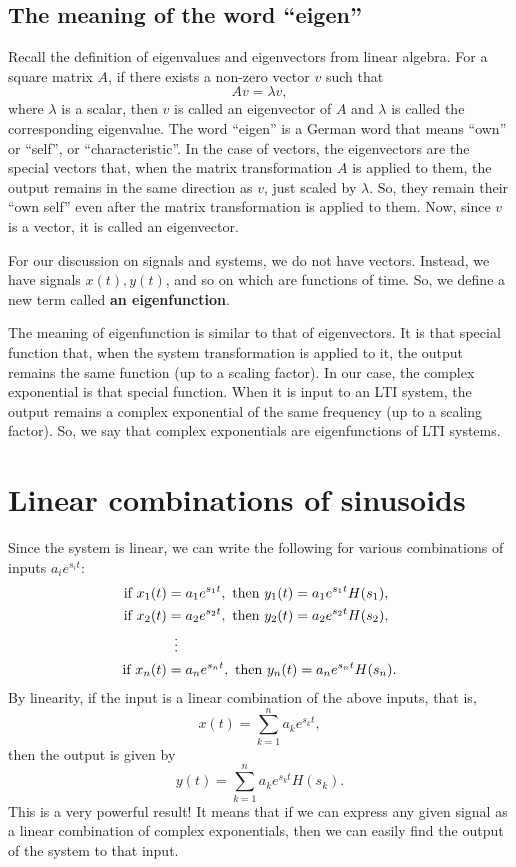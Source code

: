 \documentclass{ee102_notes}
\begin{document}
\subsection{The meaning of the word ``eigen''}
Recall the definition of eigenvalues and eigenvectors from linear algebra. For a square matrix \(A\), if there exists a non-zero vector \(v\) such that
\[
Av = \lambda v,
\]
where \(\lambda\) is a scalar, then \(v\) is called an eigenvector of \(A\) and \(\lambda\) is called the corresponding eigenvalue. The word ``eigen'' is a German word that means ``own'' or ``self'', or ``characteristic''. In the case of vectors, the eigenvectors are the special vectors that, when the matrix transformation $A$ is applied to them, the output remains in the same direction as $v$, just scaled by $\lambda$. So, they remain their ``own self'' even after the matrix transformation is applied to them. Now, since $v$ is a vector, it is called an eigenvector. 

For our discussion on signals and systems, we do not have vectors. Instead, we have signals $x(t), y(t)$, and so on which are functions of time. So, we define a new term called \textbf{an eigenfunction}. 

The meaning of eigenfunction is similar to that of eigenvectors. It is that special function that, when the system transformation is applied to it, the output remains the same function (up to a scaling factor). In our case, the complex exponential is that special function. When it is input to an LTI system, the output remains a complex exponential of the same frequency (up to a scaling factor). So, we say that complex exponentials are eigenfunctions of LTI systems.

\section{Linear combinations of sinusoids}
Since the system is linear, we can write the following for various combinations of inputs $a_i e^{s_i t}$:
\begin{align*}
  \text{if } x_1(t) &= a_1 e^{s_1 t}, \text{ then } y_1(t) = a_1 e^{s_1 t} H(s_1), \\
  \text{if } x_2(t) &= a_2 e^{s_2 t}, \text{ then } y_2(t) = a_2 e^{s_2 t} H(s_2), \\
  &\vdotswithin{=} \\
  \text{if } x_n(t) &= a_n e^{s_n t}, \text{ then } y_n(t) = a_n e^{s_n t} H(s_n).
\end{align*}
By linearity, if the input is a linear combination of the above inputs, that is,
\begin{equation}
x(t) = \sum_{k=1}^{n} a_k e^{s_k t},
\label{eq:lincomb}
\end{equation}
then the output is given by
\[
y(t) = \sum_{k=1}^{n} a_k e^{s_k t} H(s_k).
\]
This is a very powerful result! It means that if we can express any given signal as a linear combination of complex exponentials, then we can easily find the output of the system to that input.
\end{document}
